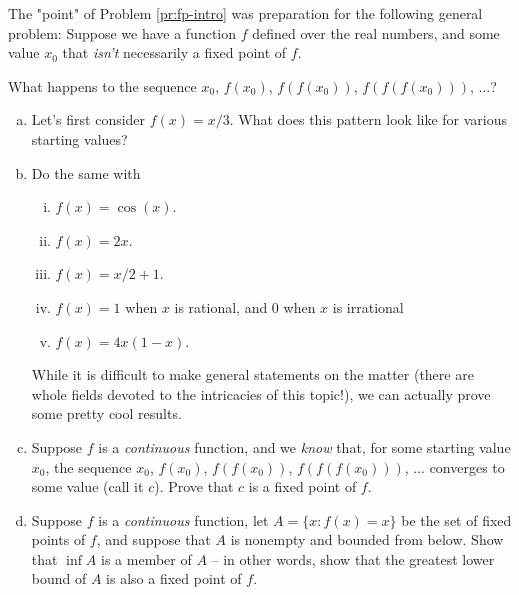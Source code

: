 \begin{problem}
\label{pr:fp-iter}


The "point" of Problem \ref{pr:fp-intro} was preparation for the following general problem: Suppose we have a function $f$ defined over the real numbers, and some value $x_0$ that \textit{isn't} necessarily a fixed point of $f$.

What happens to the sequence $x_0$, $f(x_0)$, $f(f(x_0))$, $f(f(f(x_0)))$, ...? %

\begin{enumerate}[(a)]
\item Let's first consider $f(x) = x/3$. What does this pattern look like for various starting values?
\item Do the same with 
\begin{enumerate}[i.]
\item $f(x) = \cos(x)$.
\item $f(x) = 2x$. 
\item $f(x) = x/2 + 1$. 
\item $f(x) = 1$ when $x$ is rational, and 0 when $x$ is irrational
\item $f(x) = 4x(1-x)$. %
\end{enumerate} \hfill

While it is difficult to make general statements on the matter (there are whole fields devoted to the intricacies of this topic!), we can actually prove some pretty cool results.



\item Suppose $f$ is a \emph{continuous} function, and we \emph{know} that, for some starting value $x_0$, the sequence $x_0$, $f(x_0)$, $f(f(x_0))$, $f(f(f(x_0)))$, ... converges to some value (call it $c$). Prove that $c$ is a fixed point of $f$.

\item Suppose $f$ is a \emph{continuous} function, let $A = \{x : f(x) = x\}$ be the set of fixed points of $f$, and suppose that $A$ is nonempty and bounded from below. Show that $\inf A$ is a member of $A$ -- in other words, show that the greatest lower bound of $A$ is also a fixed point of $f$.




\end{enumerate}
\end{problem}
